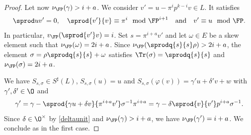 \begin{proof}

  Let now $\nu_\FP(\gamma)> i +a$. We
  consider $v' = u - \pi^i p^{k-i}v \in L$. It satisfies
  \[\sprod u {v'} = 0, \quad \sprod{v'}{v}\equiv \pi^i \mod \FP^{i+1} \quad \text{and} \quad v' \equiv u \mod \FP.\]
  In particular, $v_\FP(\sprod {v'}v) = i$.
  Set $s = \pi^{i+a}v'$ and let $\omega\in E$ be a skew element such that $\nu_\FP(\omega) = 2i + a$.
  Since $\nu_\FP(\sprodq{s}{s} \rho) %
  > 2i+a$, the element $\sigma = \rho \sprodq{s}{s} + \omega$ satisfies $\Tr(\sigma) = \sprodq{s}{s}$ and
  $\nu_\FP(\sigma) = 2i + a$.

  We have $S_{s,\sigma} \in S^\sharp(L)$,
  $S_{s,\sigma}(u) = u$ and $S_{s,\sigma}(\varphi(v)) = \gamma' u + \delta' v + w$
  with $\gamma',\delta' \in \O$ and
  \[\gamma' = \gamma - \sprod{\gamma u + \delta v}{\pi^{i+a}v'}\sigma^{-1} \pi^{i+a}
  = \gamma - \delta \sprod{v}{v'} p^{i+a}\sigma^{-1}.\]
  Since $\delta \in \O^\times$ by \cref{deltaunit} and $\nu_\FP(\gamma)>i+a$, we have
  $\nu_\FP(\gamma') = i+a$. We conclude as in the first case.
\end{proof}

